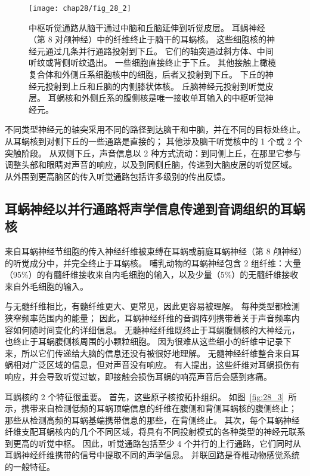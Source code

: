 \begin{figure}[htbp]
	\centering
	\texttt{[image: chap28/fig\_28\_2]}
	\caption{中枢听觉通路从脑干通过中脑和丘脑延伸到听觉皮层。
		耳蜗神经（第 8 对颅神经）中的纤维终止于脑干的耳蜗核。
		这些细胞核的神经元通过几条并行通路投射到下丘。
		它们的轴突通过斜方体、中间听纹或背侧听纹退出。
		一些细胞直接终止于下丘。
		其他接触上橄榄复合体和外侧丘系细胞核中的细胞，后者又投射到下丘。
		下丘的神经元投射到上丘和丘脑的内侧膝状体核。
		丘脑神经元投射到听觉皮层。
		耳蜗核和外侧丘系的腹侧核是唯一接收单耳输入的中枢听觉神经元。}
	\label{fig:28_2}
\end{figure}


不同类型神经元的轴突采用不同的路径到达脑干和中脑，并在不同的目标处终止。
从耳蜗核到对侧下丘的一些通路是直接的；
其他涉及脑干听觉核中的 1 个或 2 个突触阶段。
从双侧下丘，声音信息以 2 种方式流动：到同侧上丘，在那里它参与调整头部和眼睛对声音的响应，以及到同侧丘脑，传递到大脑皮层的听觉区域。
从外围到更高脑区的传入听觉通路包括许多级别的传出反馈。



\subsection{耳蜗神经以并行通路将声学信息传递到音调组织的耳蜗核}

来自耳蜗神经节细胞的传入神经纤维被束缚在耳蜗或前庭耳蜗神经（第 8 颅神经）的听觉成分中，并完全终止于耳蜗核。
哺乳动物的耳蜗神经包含 2 组纤维：大量（95\%）的有髓纤维接收来自内毛细胞的输入，以及少量（5\%）的无髓纤维接收来自外毛细胞的输入。


与无髓纤维相比，有髓纤维更大、更常见，因此更容易被理解。
每种类型都检测狭窄频率范围内的能量；
因此，耳蜗神经纤维的音调阵列携带着关于声音频率内容如何随时间变化的详细信息。
无髓神经纤维既终止于耳蜗腹侧核的大神经元，也终止于耳蜗腹侧核周围的小颗粒细胞。
因为很难从这些细小的纤维中记录下来，所以它们传递给大脑的信息还没有被很好地理解。
无髓神经纤维整合来自耳蜗相对广泛区域的信息，但对声音没有响应。
有人提出，这些纤维对耳蜗损伤有响应，并会导致听觉过敏，即接触会损伤耳蜗的响亮声音后会感到疼痛。


耳蜗核的 2 个特征很重要。
首先，这些原子核按拓扑组织。
如图~\ref{fig:28_3}~所示，携带来自检测低频的耳蜗顶端信息的纤维在腹侧和背侧耳蜗核的腹侧终止； 
那些从检测高频的耳蜗基端携带信息的那些，在背侧终止。 
其次，每个耳蜗神经纤维支配耳蜗核内的几个不同区域，将具有不同投射模式的各种类型的神经元联系到更高的听觉中枢。
因此，听觉通路包括至少 4 个并行的上行通路，它们同时从耳蜗神经纤维携带的信号中提取不同的声学信息。
并联回路是脊椎动物感觉系统的一般特征。


